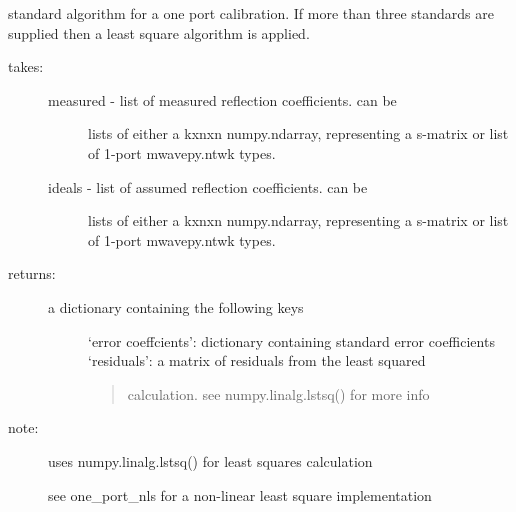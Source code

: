 \documentclass[letterpaper,10pt,english]{sphinxmanual}
\begin{document}
\begin{fulllineitems}
\label{api/mwavepy.calibration:mwavepy.calibration.calibrationAlgorithms.one_port}
standard algorithm for a one port calibration. If more than three 
standards are supplied then a least square algorithm is applied.
\begin{description}
\item[{takes: }] \leavevmode\begin{description}
\item[{measured - list of measured reflection coefficients. can be }] \leavevmode
lists of either a kxnxn numpy.ndarray, representing a 
s-matrix or list of  1-port mwavepy.ntwk types.

\item[{ideals - list of assumed reflection coefficients. can be }] \leavevmode
lists of either a kxnxn numpy.ndarray, representing a 
s-matrix or list of  1-port mwavepy.ntwk types.

\end{description}

\item[{returns:}] \leavevmode\begin{description}
\item[{a dictionary containing the following keys}] \leavevmode
`error coeffcients': dictionary containing standard error
coefficients
`residuals': a matrix of residuals from the least squared
\begin{quote}

calculation. see numpy.linalg.lstsq() for more info
\end{quote}

\end{description}

\item[{note:}] \leavevmode
uses numpy.linalg.lstsq() for least squares calculation

see one\_port\_nls for a non-linear least square implementation

\end{description}

\end{fulllineitems}

\end{document}
